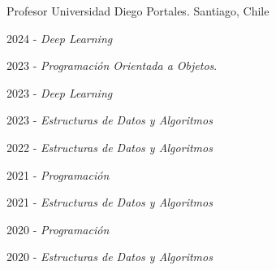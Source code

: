 

\begin{cventries}

  \cventry
    {Profesor} %
    {Universidad Diego Portales.} %
    {Santiago, Chile} %
    {} %
    {
      \begin{cvitems} %
        \item 2024 - \emph{Deep Learning}
        \item 2023 - \emph{Programación Orientada a Objetos}.
        \item 2023 - \emph{Deep Learning}
        \item 2023 - \emph{Estructuras de Datos y Algoritmos}
        \item 2022 - \emph{Estructuras de Datos y Algoritmos}
        \item 2021 - \emph{Programación}
        \item 2021 - \emph{Estructuras de Datos y Algoritmos}
        \item 2020 - \emph{Programación}
        \item 2020 - \emph{Estructuras de Datos y Algoritmos}
      \end{cvitems}
    }

\end{cventries}

